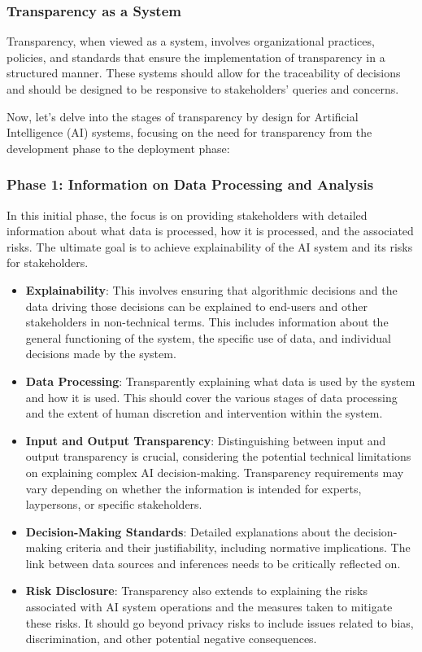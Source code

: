 \documentclass{article}
\begin{document}
\subsubsection{Transparency as a System}

Transparency, when viewed as a system, involves organizational practices, policies, and standards that ensure the implementation of transparency in a structured manner. These systems should allow for the traceability of decisions and should be designed to be responsive to stakeholders' queries and concerns.

Now, let's delve into the stages of transparency by design for Artificial Intelligence (AI) systems, focusing on the need for transparency from the development phase to the deployment phase:

\subsubsection{Phase 1: Information on Data Processing and Analysis}

In this initial phase, the focus is on providing stakeholders with detailed information about what data is processed, how it is processed, and the associated risks. The ultimate goal is to achieve explainability of the AI system and its risks for stakeholders.

\begin{itemize}
    \item \textbf{Explainability}: This involves ensuring that algorithmic decisions and the data driving those decisions can be explained to end-users and other stakeholders in non-technical terms. This includes information about the general functioning of the system, the specific use of data, and individual decisions made by the system.
    
    \item \textbf{Data Processing}: Transparently explaining what data is used by the system and how it is used. This should cover the various stages of data processing and the extent of human discretion and intervention within the system.
    
    \item \textbf{Input and Output Transparency}: Distinguishing between input and output transparency is crucial, considering the potential technical limitations on explaining complex AI decision-making. Transparency requirements may vary depending on whether the information is intended for experts, laypersons, or specific stakeholders.
    
    \item \textbf{Decision-Making Standards}: Detailed explanations about the decision-making criteria and their justifiability, including normative implications. The link between data sources and inferences needs to be critically reflected on.
    
    \item \textbf{Risk Disclosure}: Transparency also extends to explaining the risks associated with AI system operations and the measures taken to mitigate these risks. It should go beyond privacy risks to include issues related to bias, discrimination, and other potential negative consequences.
\end{itemize}
\end{document}
